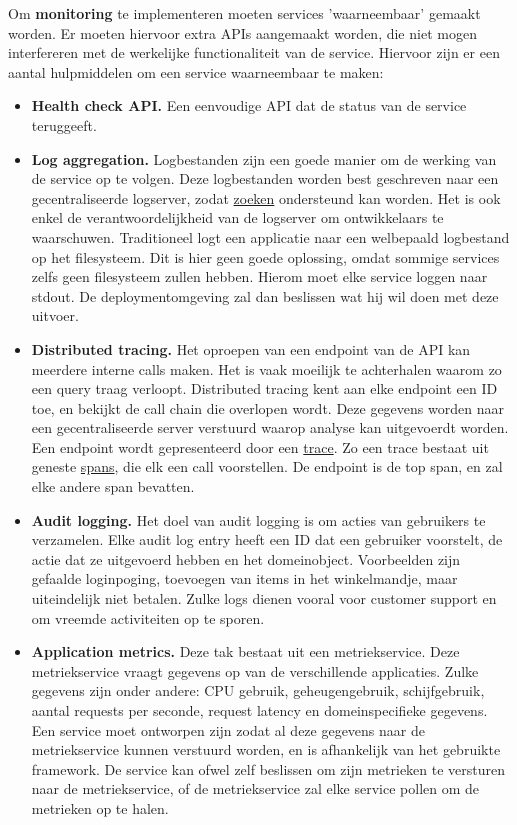 	Om \textbf{monitoring} te implementeren moeten services 'waarneembaar' gemaakt worden. Er moeten hiervoor extra APIs aangemaakt worden, die niet mogen interfereren met de werkelijke functionaliteit van de service. Hiervoor zijn er een aantal hulpmiddelen om een service waarneembaar te maken:
	\begin{itemize}
		\item[\info]\textbf{Health check API.} Een eenvoudige API dat de status van de service teruggeeft.
		\item[\info]\textbf{Log aggregation.} Logbestanden zijn een goede manier om de werking van de service op te volgen. Deze logbestanden worden best geschreven naar een gecentraliseerde logserver, zodat \underline{zoeken} ondersteund kan worden. Het is ook enkel de verantwoordelijkheid van de logserver om ontwikkelaars te waarschuwen. Traditioneel logt een applicatie naar een welbepaald logbestand op het filesysteem. Dit is hier geen goede oplossing, omdat sommige services zelfs geen filesysteem zullen hebben. Hierom moet elke service loggen naar stdout. De deploymentomgeving zal dan beslissen wat hij wil doen met deze uitvoer. 
		\item[\info]\textbf{Distributed tracing.} Het oproepen van een endpoint van de API kan meerdere interne calls maken. Het is vaak moeilijk te achterhalen waarom zo een query traag verloopt. Distributed tracing kent aan elke endpoint een ID toe, en bekijkt de call chain die overlopen wordt. Deze gegevens worden naar een gecentraliseerde server verstuurd waarop analyse kan uitgevoerdt worden. Een endpoint wordt gepresenteerd door een \underline{trace}. Zo een trace bestaat uit geneste \underline{spans}, die elk een call voorstellen. De endpoint is de top span, en zal elke andere span bevatten. 
		\item[\info]\textbf{Audit logging.} Het doel van audit logging is om acties van gebruikers te verzamelen. Elke audit log entry heeft een ID dat een gebruiker voorstelt, de actie dat ze uitgevoerd hebben en het domeinobject. Voorbeelden zijn gefaalde loginpoging, toevoegen van items in het winkelmandje, maar uiteindelijk niet betalen. Zulke logs dienen vooral voor customer support en om vreemde activiteiten op te sporen.
		\item[\info]\textbf{Application metrics.} Deze tak bestaat uit een metriekservice. Deze metriekservice vraagt gegevens op van de verschillende applicaties. Zulke gegevens zijn onder andere: CPU gebruik, geheugengebruik, schijfgebruik, aantal requests per seconde, request latency en domeinspecifieke gegevens. Een service moet ontworpen zijn zodat al deze gegevens naar de metriekservice kunnen verstuurd worden, en is afhankelijk van het gebruikte framework. De service kan ofwel zelf beslissen om zijn metrieken te versturen naar de metriekservice, of de metriekservice zal elke service pollen om de metrieken op te halen.
	\end{itemize}
